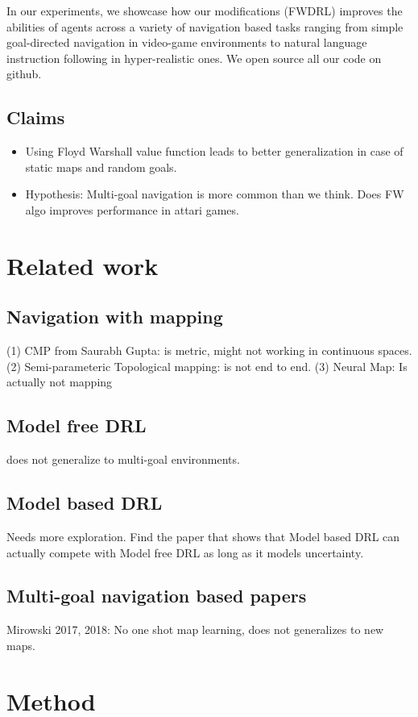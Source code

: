 \documentclass[letterpaper]{article} %
\begin{document}
In our experiments, we showcase how our modifications (FWDRL) improves
the abilities of agents across a variety of navigation based tasks
ranging from simple goal-directed navigation in video-game environments
to natural language instruction following in hyper-realistic ones. We
open source all our code on github.  

\subsection{Claims}
\begin{itemize} \item
Using Floyd Warshall value function leads to better generalization in case of static maps and
random goals.
\item
Hypothesis: Multi-goal navigation is more common than we think. Does FW algo improves performance in attari games.
\end{itemize}

\section{Related work}
\subsection{Navigation with mapping}
 (1) CMP from Saurabh Gupta: is metric, might not working in continuous spaces.
 (2) Semi-parameteric Topological mapping: is not end to end.
 (3) Neural Map: Is actually not mapping

\subsection{Model free DRL }
does not generalize to multi-goal environments.

\subsection{Model based DRL}
Needs more exploration.
Find the paper that shows that Model based DRL can actually compete with Model free DRL as long as it models uncertainty.

\subsection{Multi-goal navigation based papers}
Mirowski 2017, 2018: No one shot map learning, does not generalizes to new maps.


\section{Method}
\end{document}
